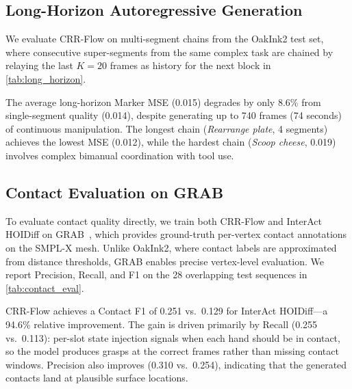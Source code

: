 \documentclass[sigconf, screen, review, anonymous]{acmart}
\begin{document}
 
\subsection{Long-Horizon Autoregressive Generation}
\label{sec:long_horizon}

We evaluate CRR-Flow on multi-segment chains from the OakInk2 test set, where consecutive super-segments from the same complex task are chained by relaying the last $K{=}20$ frames as history for the next block in \cref{tab:long_horizon}.

The average long-horizon Marker MSE (0.015) degrades by only 8.6\% from single-segment quality (0.014), despite generating up to 740 frames (74 seconds) of continuous manipulation.
The longest chain (\emph{Rearrange plate}, 4 segments) achieves the lowest MSE (0.012), while the hardest chain (\emph{Scoop cheese}, 0.019) involves complex bimanual coordination with tool use.

\subsection{Contact Evaluation on GRAB}
\label{sec:contact_eval}
 
To evaluate contact quality directly, we train both CRR-Flow and InterAct HOIDiff on GRAB~\cite{taheri2020grab}, which provides ground-truth per-vertex contact annotations on the SMPL-X mesh.
Unlike OakInk2, where contact labels are approximated from distance thresholds, GRAB enables precise vertex-level evaluation.
We report Precision, Recall, and F1 on the 28 overlapping test sequences in \cref{tab:contact_eval}.
 
CRR-Flow achieves a Contact F1 of 0.251 vs.\ 0.129 for InterAct HOIDiff---a 94.6\% relative improvement.
The gain is driven primarily by Recall (0.255 vs.\ 0.113): per-slot state injection signals when each hand should be in contact, so the model produces grasps at the correct frames rather than missing contact windows.
Precision also improves (0.310 vs.\ 0.254), indicating that the generated contacts land at plausible surface locations.
 
 

\end{document}
